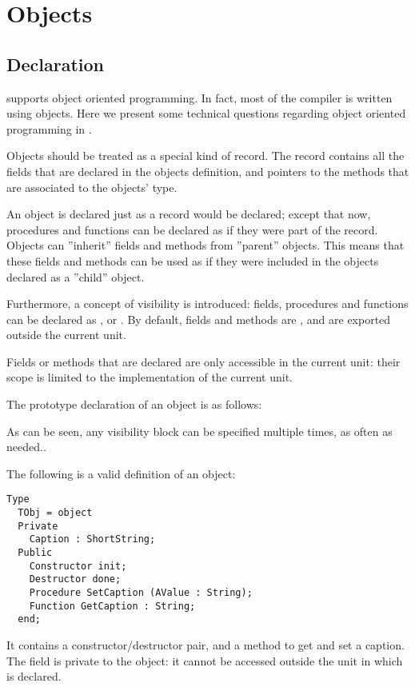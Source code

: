 \chapter{Objects}
\label{ch:Objects}

\section{Declaration}
\fpc supports object oriented programming. In fact, most  of the compiler is
written using objects. Here we present some technical questions regarding
object oriented programming in \fpc.

Objects should be treated as a special kind of record. The record contains
all the fields that are declared in the objects definition, and pointers
to the methods that are associated to the objects' type.

An object is declared just as a record would be declared; except that
now, procedures and functions can be declared as if they were part of the record.
Objects can ''inherit'' fields and methods from ''parent'' objects. This means
that these fields and methods can be used as if they were included in the
objects declared as a ''child'' object.

Furthermore, a concept of visibility  is introduced: 
fields, procedures and functions can be declared as ,
 or 
. By default, fields and methods are , and 
are exported outside the current unit. 

Fields or methods that are declared  are only accessible 
in the current unit: their scope is limited to the implementation of the
current unit.

The prototype declaration of an object is as follows:

As can be seen, any visibility block can be specified multiple times, as
often as needed..

The following is a valid definition of an object:
\begin{verbatim}
Type
  TObj = object
  Private
    Caption : ShortString;
  Public
    Constructor init;
    Destructor done;
    Procedure SetCaption (AValue : String);
    Function GetCaption : String;
  end;
\end{verbatim}
It contains a constructor/destructor pair, and a method to get and set a
caption. The  field is private to the object: it cannot be accessed
outside the unit in which  is declared.

